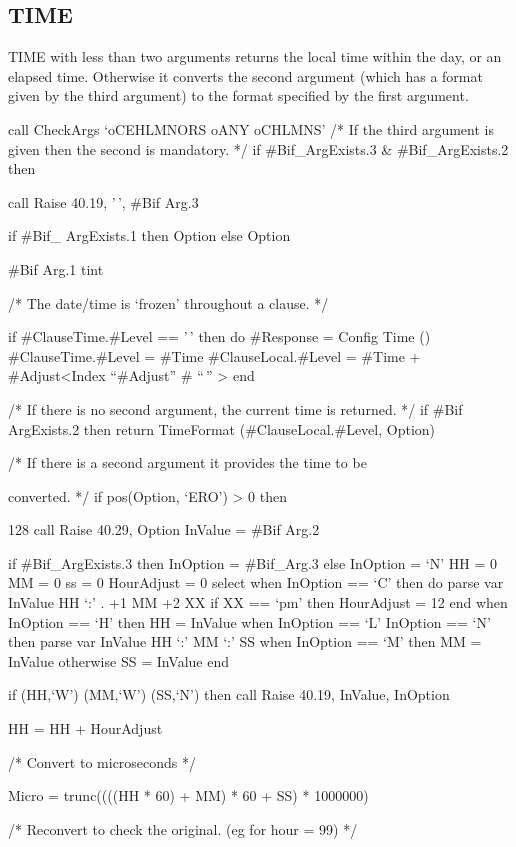 \subsection{TIME}\label{time-1}

TIME with less than two arguments returns the local time within the day,
or an elapsed time. Otherwise it converts the second argument (which has
a format given by the third argument) to the format specified by the
first argument.

call CheckArgs `oCEHLMNORS oANY oCHLMNS' /* If the third argument is
given then the second is mandatory. */ if \#Bif\_ArgExists.3 \&
\#Bif\_ArgExists.2 then

call Raise 40.19, '\,', \#Bif Arg.3

if \#Bif\_ ArgExists.1 then Option else Option

\#Bif Arg.1 tint

/* The date/time is `frozen' throughout a clause. */

if \#ClauseTime.\#Level == '\,' then do \#Response = Config Time ()
\#ClauseTime.\#Level = \#Time \#ClauseLocal.\#Level = \#Time +
\#Adjust\textless Index ``\#Adjust'' \# ``\,'' \textgreater{} end

/* If there is no second argument, the current time is returned. */ if
\#Bif ArgExists.2 then return TimeFormat (\#ClauseLocal.\#Level, Option)

/* If there is a second argument it provides the time to be

converted. */ if pos(Option, `ERO') \textgreater{} 0 then

128 call Raise 40.29, Option InValue = \#Bif Arg.2

if \#Bif\_ArgExists.3 then InOption = \#Bif\_Arg.3 else InOption = `N'
HH = 0 MM = 0 ss = 0 HourAdjust = 0 select when InOption == `C' then do
parse var InValue HH `:' . +1 MM +2 XX if XX == `pm' then HourAdjust =
12 end when InOption == `H' then HH = InValue when InOption == `L'
\textbar{} InOption == `N' then parse var InValue HH `:' MM `:' SS when
InOption == `M' then MM = InValue otherwise SS = InValue end

if \datatype(HH,`W') \textbar{} \datatype(MM,`W') \textbar{}
\datatype(SS,`N') then call Raise 40.19, InValue, InOption

HH = HH + HourAdjust

/* Convert to microseconds */

Micro = trunc((((HH * 60) + MM) * 60 + SS) * 1000000)

/* Reconvert to check the original. (eg for hour = 99) */

